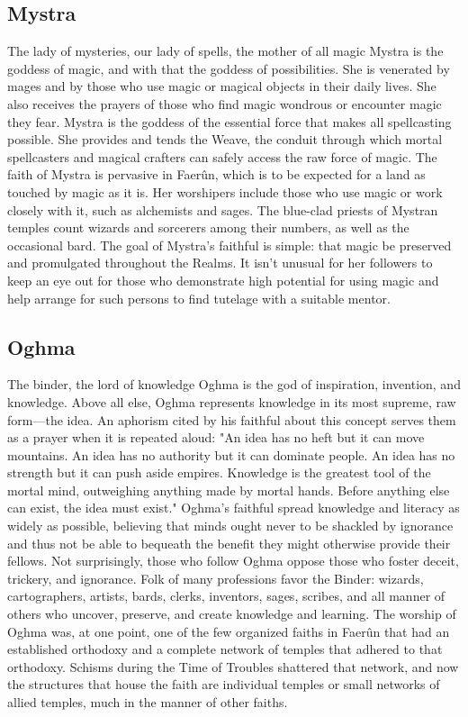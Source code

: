 \documentclass[10pt,a4paper,twoside,twocolumn,openany,bg=print,nodeprecatedcode]{dndbook}
\begin{document}
\subsection{Mystra}
The lady of mysteries, our lady of spells, the mother of all magic
Mystra is the goddess of magic, and with that the goddess of possibilities. She is venerated by mages and by those who use magic or magical objects in their daily lives. She also receives the prayers of those who find magic wondrous or encounter magic they fear. Mystra is the goddess of the essential force that makes all spellcasting possible. She provides and tends the Weave, the conduit through which mortal spellcasters and magical crafters can safely access the raw force of magic.
The faith of Mystra is pervasive in Faerûn, which is to be expected for a land as touched by magic as it is. Her worshipers include those who use magic or work closely with it, such as alchemists and sages. The blue-clad priests of Mystran temples count wizards and sorcerers among their numbers, as well as the occasional bard. The goal of Mystra's faithful is simple: that magic be preserved and promulgated throughout the Realms. It isn't unusual for her followers to keep an eye out for those who demonstrate high potential for using magic and help arrange for such persons to find tutelage with a suitable mentor.
\subsection{Oghma}
The binder, the lord of knowledge
Oghma is the god of inspiration, invention, and knowledge. Above all else, Oghma represents knowledge in its most supreme, raw form—the idea. An aphorism cited by his faithful about this concept serves them as a prayer when it is repeated aloud: "An idea has no heft but it can move mountains. An idea has no authority but it can dominate people. An idea has no strength but it can push aside empires. Knowledge is the greatest tool of the mortal mind, outweighing anything made by mortal hands. Before anything else can exist, the idea must exist."
Oghma's faithful spread knowledge and literacy as widely as possible, believing that minds ought never to be shackled by ignorance and thus not be able to bequeath the benefit they might otherwise provide their fellows. Not surprisingly, those who follow Oghma oppose those who foster deceit, trickery, and ignorance.
Folk of many professions favor the Binder: wizards, cartographers, artists, bards, clerks, inventors, sages, scribes, and all manner of others who uncover, preserve, and create knowledge and learning. The worship of Oghma was, at one point, one of the few organized faiths in Faerûn that had an established orthodoxy and a complete network of temples that adhered to that orthodoxy. Schisms during the Time of Troubles shattered that network, and now the structures that house the faith are individual temples or small networks of allied temples, much in the manner of other faiths.
\end{document}
